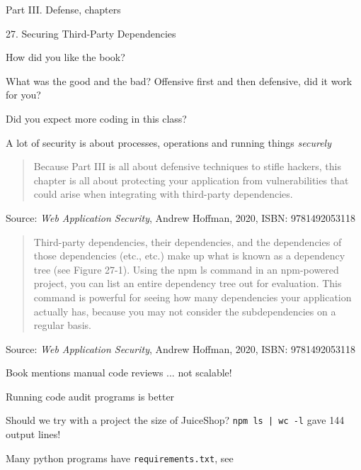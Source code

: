 \documentclass[Screen16to9,17pt]{foils}
\begin{document}
\begin{list1}
\item Part III. Defense, chapters
\item 27. Securing Third-Party Dependencies
\end{list1}

How did you like the book?

What was the good and the bad? Offensive first and then defensive, did it work for you?

Did you expect more coding in this class?

A lot of security is about processes, operations and running things \emph{securely}



\begin{quote}
Because Part III is all about defensive techniques to stifle hackers, this chapter is all about protecting your application from vulnerabilities that could arise when integrating with third-party dependencies.
\end{quote}

Source: \emph{Web Application Security}, Andrew Hoffman, 2020, ISBN: 9781492053118






\begin{quote}
Third-party dependencies, their dependencies, and the dependencies of those dependencies (etc., etc.) make up what is known as a dependency tree (see Figure 27-1). Using the npm ls command in an npm-powered project, you can list an entire dependency tree out for evaluation. This command is powerful for seeing how many dependencies your application actually has, because you may not consider the subdependencies on a regular basis.
\end{quote}
Source: \emph{Web Application Security}, Andrew Hoffman, 2020, ISBN: 9781492053118

\begin{list2}
\item Book mentions manual code reviews ... not scalable!
\item Running code audit programs is better
\item Should we try with a project the size of JuiceShop? \verb+npm ls | wc -l+ gave 144 output lines!
\item Many python programs have \verb+requirements.txt+, see 
\end{list2}
\end{document}
